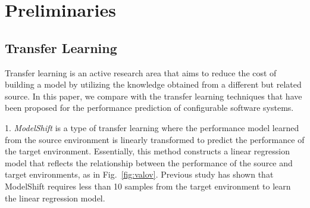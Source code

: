 \section{Preliminaries}
\label{sec:prelim}





\subsection{Transfer Learning}
\label{sec:prelim:tl}
Transfer learning is an active research area that aims to reduce the cost of building a model by utilizing the knowledge obtained from a different but related source.
In this paper, we compare with the transfer learning techniques that have been proposed for the performance prediction of configurable software systems.

1. \textit{ModelShift} is a type of transfer learning where the performance model learned from the source environment is linearly transformed to predict the performance of the target environment\cite{Valov}. Essentially, this method constructs a linear regression model that reflects the relationship between the performance of the source and target environments, as in Fig.~\ref{fig:valov}. Previous study has shown that ModelShift requires less than 10 samples from the target environment to learn the linear regression model\cite{Valov}. 

